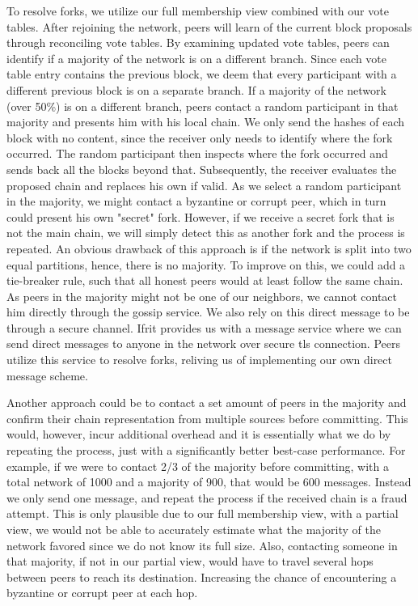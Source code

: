 \documentclass[USenglish]{uit-thesis}
\begin{document}
To resolve forks, we utilize our full membership view combined with our vote tables.
After rejoining the network, peers will learn of the current block proposals through reconciling vote tables.
By examining updated vote tables, peers can identify if a majority of the network is on a different branch.
Since each vote table entry contains the previous block, we deem that every participant with a different previous block is on a separate branch.  
If a majority of the network (over 50\%) is on a different branch, peers contact a random participant in that majority and presents him with his local chain.
We only send the hashes of each block with no content, since the receiver only needs to identify where the fork occurred.
The random participant then inspects where the fork occurred and sends back all the blocks beyond that.
Subsequently, the receiver evaluates the proposed chain and replaces his own if valid.
As we select a random participant in the majority, we might contact a byzantine or corrupt peer, which in turn could present his own "secret" fork.
However, if we receive a secret fork that is not the main chain, we will simply detect this as another fork and the process is repeated.
An obvious drawback of this approach is if the network is split into two equal partitions, hence, there is no majority.
To improve on this, we could add a tie-breaker rule, such that all honest peers would at least follow the same chain.
As peers in the majority might not be one of our neighbors, we cannot contact him directly through the gossip service.
We also rely on this direct message to be through a secure channel.
Ifrit provides us with a message service where we can send direct messages to anyone in the network over secure \gls{tls} connection.
Peers utilize this service to resolve forks, reliving us of implementing our own direct message scheme.  

Another approach could be to contact a set amount of peers in the majority and confirm their chain representation from multiple sources before committing.
This would, however, incur additional overhead and it is essentially what we do by repeating the process, just with a significantly better best-case performance.
For example, if we were to contact 2/3 of the majority before committing, with a total network of 1000 and a majority of 900, that would be 600 messages.
Instead we only send one message, and repeat the process if the received chain is a fraud attempt.
This is only plausible due to our full membership view, with a partial view, we would not be able to accurately estimate what the majority of the network favored since we do not know its full size.
Also, contacting someone in that majority, if not in our partial view, would have to travel several hops between peers to reach its destination.
Increasing the chance of encountering a byzantine or corrupt peer at each hop.
\end{document}
